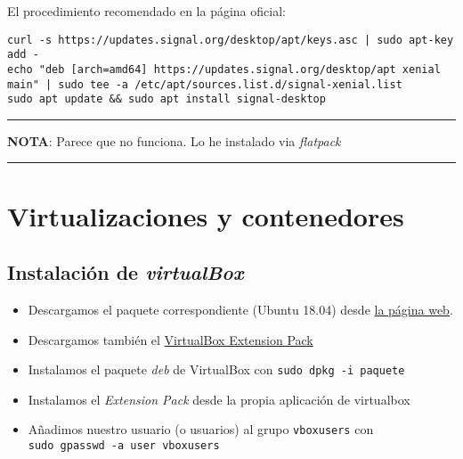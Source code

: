 \documentclass[
  12pt,
  spanish,
]{article}
\providecommand{\tightlist}{%
  \setlength{\itemsep}{0pt}\setlength{\parskip}{0pt}}
\begin{document}
El procedimiento recomendado en la página oficial:

\begin{verbatim}
curl -s https://updates.signal.org/desktop/apt/keys.asc | sudo apt-key add -
echo "deb [arch=amd64] https://updates.signal.org/desktop/apt xenial main" | sudo tee -a /etc/apt/sources.list.d/signal-xenial.list
sudo apt update && sudo apt install signal-desktop
\end{verbatim}

\begin{center}\rule{0.5\linewidth}{\linethickness}\end{center}

\textbf{NOTA}: Parece que no funciona. Lo he instalado via
\emph{flatpack}

\begin{center}\rule{0.5\linewidth}{\linethickness}\end{center}

\hypertarget{virtualizaciones-y-contenedores}{%
\section{Virtualizaciones y
contenedores}\label{virtualizaciones-y-contenedores}}

\hypertarget{instalaciuxf3n-de-virtualbox}{%
\subsection{\texorpdfstring{Instalación de
\emph{virtualBox}}{Instalación de virtualBox}}\label{instalaciuxf3n-de-virtualbox}}

\begin{itemize}
\tightlist
\item
  Descargamos el paquete correspondiente (Ubuntu 18.04) desde
  \href{https://www.virtualbox.org/wiki/Linux_Downloads}{la página web}.
\item
  Descargamos también el
  \href{https://www.virtualbox.org/wiki/Downloads}{VirtualBox Extension
  Pack}
\item
  Instalamos el paquete \emph{deb} de VirtualBox con
  \texttt{sudo\ dpkg\ -i\ paquete}
\item
  Instalamos el \emph{Extension Pack} desde la propia aplicación de
  virtualbox
\item
  Añadimos nuestro usuario (o usuarios) al grupo \texttt{vboxusers} con
  \texttt{sudo\ gpasswd\ -a\ user\ vboxusers}
\end{itemize}
\end{document}
